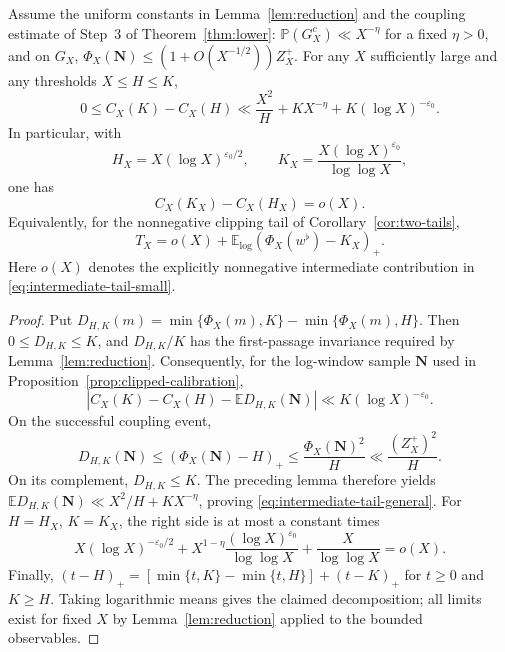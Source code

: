 \begin{proposition}
\label{prop:intermediate-tail}
Assume the uniform constants in Lemma~\ref{lem:reduction} and the
coupling estimate of Step~3 of Theorem~\ref{thm:lower}:
$\mathbb P(G_X^c)\ll X^{-\eta}$ for a fixed $\eta>0$, and on
$G_X$, $\Phi_X(\mathbf N)\le(1+O(X^{-1/2}))Z_X^+$.
For any $X$ sufficiently large and any thresholds $X\le H\le K$,
\begin{equation}\label{eq:intermediate-tail-general}
 0\le C_X(K)-C_X(H)
 \ll \frac{X^2}{H}+KX^{-\eta}
      +K(\log X)^{-\varepsilon_0}.
\end{equation}
In particular, with
\[
 H_X=X(\log X)^{\varepsilon_0/2},\qquad
 K_X=\frac{X(\log X)^{\varepsilon_0}}{\log\log X},
\]
one has
\begin{equation}\label{eq:intermediate-tail-small}
 C_X(K_X)-C_X(H_X)=o(X).
\end{equation}
Equivalently, for the nonnegative clipping tail of
Corollary~\ref{cor:two-tails},
\[
 T_X=o(X)+\mathbb E_{\log}(\Phi_X(w^\flat)-K_X)_+.
\]
Here $o(X)$ denotes the explicitly nonnegative intermediate
contribution in \eqref{eq:intermediate-tail-small}.
\end{proposition}
\begin{proof}
Put
$D_{H,K}(m)=\min\{\Phi_X(m),K\}-\min\{\Phi_X(m),H\}$.
Then $0\le D_{H,K}\le K$, and $D_{H,K}/K$ has the
first-passage invariance required by Lemma~\ref{lem:reduction}.
Consequently, for the log-window sample $\mathbf N$ used in
Proposition~\ref{prop:clipped-calibration},
\[
 \left|C_X(K)-C_X(H)-\mathbb E D_{H,K}(\mathbf N)\right|
 \ll K(\log X)^{-\varepsilon_0}.
\]
On the successful coupling event,
\[
 D_{H,K}(\mathbf N)\le(\Phi_X(\mathbf N)-H)_+
 \le\frac{\Phi_X(\mathbf N)^2}{H}
 \ll\frac{(Z_X^+)^2}{H}.
\]
On its complement, $D_{H,K}\le K$.
The preceding lemma therefore yields
$\mathbb E D_{H,K}(\mathbf N)\ll X^2/H+KX^{-\eta}$,
proving \eqref{eq:intermediate-tail-general}.
For $H=H_X$, $K=K_X$, the right side is at most a constant times
\[
 X(\log X)^{-\varepsilon_0/2}
 +X^{1-\eta}\frac{(\log X)^{\varepsilon_0}}{\log\log X}
 +\frac{X}{\log\log X}=o(X).
\]
Finally,
$(t-H)_+=[\min\{t,K\}-\min\{t,H\}]+(t-K)_+$
for $t\ge0$ and $K\ge H$. Taking logarithmic means gives the
claimed decomposition; all limits exist for fixed $X$ by
Lemma~\ref{lem:reduction} applied to the bounded observables.
\end{proof}


